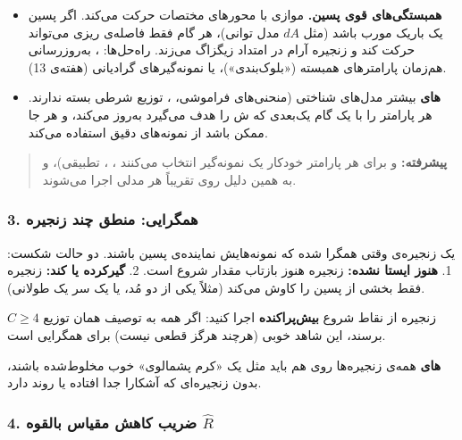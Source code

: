 \begin{itemize}
\tightlist
\item
  \textbf{همبستگی‌های قوی پسین.}  موازی با محورهای مختصات حرکت
  می‌کند. اگر پسین یک  باریک مورب باشد (مثل 
  \(A\)\lr{--}\(d\) مدل توانی)، هر گام فقط فاصله‌ی ریزی می‌تواند حرکت کند و
  زنجیره آرام در امتداد  زیگزاگ می‌زند. راه‌حل‌ها:
  ، به‌روزرسانی هم‌زمان پارامترهای همبسته
  («بلوک‌بندی»)، یا نمونه‌گیرهای گرادیانی (هفته‌ی 13).
\item
  \textbf{های } بیشتر مدل‌های
  شناختی (منحنی‌های فراموشی، ،  توزیع شرطی بسته ندارند.
  \textbf{} هر پارامتر را با یک گام
   یک‌بعدی که ش را هدف می‌گیرد به‌روز
  می‌کند، و هر جا ممکن باشد از نمونه‌های دقیق  استفاده می‌کند.
\end{itemize}

\begin{quote}
\textbf{پیشرفته:}  و  برای هر پارامتر خودکار یک
نمونه‌گیر انتخاب می‌کنند ، ،
 تطبیقی)، و به همین دلیل روی تقریباً هر مدلی اجرا می‌شوند.
\end{quote}

\subsubsection{3. همگرایی: منطق چند زنجیره}

یک زنجیره‌ی  وقتی همگرا شده که نمونه‌هایش نماینده‌ی پسین باشند. دو
حالت شکست: 1. \textbf{هنوز ایستا نشده:} زنجیره هنوز بازتاب مقدار شروع
است. 2. \textbf{گیرکرده یا کند:} زنجیره فقط بخشی از پسین را کاوش می‌کند
(مثلاً یکی از دو مُد، یا یک سر یک  طولانی).

\(C \ge 4\) زنجیره از نقاط شروع \textbf{بیش‌پراکنده}
 اجرا کنید: اگر همه به توصیف همان توزیع برسند، این
شاهد خوبی (هرچند هرگز قطعی نیست) برای همگرایی است.

\textbf{های} همه‌ی زنجیره‌ها روی هم باید مثل یک «کرم
پشمالوی» خوب مخلوط‌شده باشند، بدون زنجیره‌ای که آشکارا جدا افتاده یا روند
دارد.

\subsubsection{\texorpdfstring{4. ضریب کاهش مقیاس بالقوه
\(\hat R\)}{4. ضریب کاهش مقیاس بالقوه \textbackslash hat R}}

